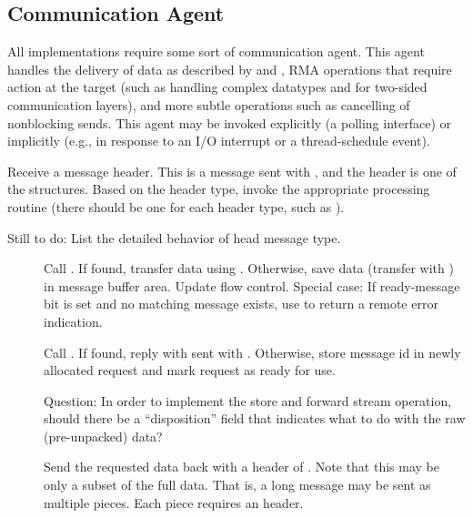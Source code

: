 \documentclass{article}
\begin{document}
\subsection{Communication Agent}
All implementations require some sort of communication agent.  This agent
handles the delivery of data as described by  and
, RMA operations that require action at the target (such as
handling complex datatypes and for two-sided communication layers), and more
subtle operations such as cancelling of nonblocking sends.  This agent may be
invoked explicitly (a polling interface) or implicitly (e.g., in response to
an I/O interrupt or a thread-schedule event).  

\begin{tcp}
Receive a message header.  This is a message sent with ,
and the header is one of the  structures.
Based on the header type, invoke the appropriate processing routine (there
should be one for each header type, such as
). 

Still to do:  List the detailed behavior of head message type.
\begin{description}
\item[]
Call .  If found, transfer data using
.  Otherwise, save data (transfer with ) in
message buffer area.  Update flow control.
Special case: If ready-message bit is set and no matching message
exists, use  to return a remote error indication.

\item[]
Call .  If found, reply with
 sent with .  Otherwise,
store message id in newly allocated request and mark request as ready for use.

Question: In order to implement the store and forward stream
operation, should there be a ``disposition'' field that indicates what
to do with the raw (pre-unpacked) data?

\item[]Send the requested data back
with a header of .  Note that this may be
only a subset of the full data.  That is, a long message may be sent
as multiple pieces.  Each piece requires an 
header.


\end{description}
\end{tcp}
\end{document}
